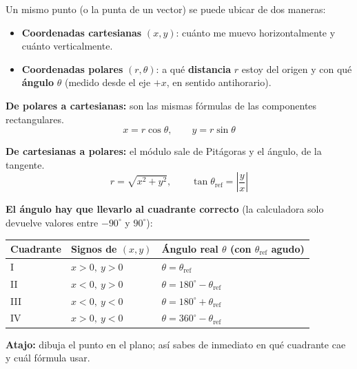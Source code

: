 \documentclass[12pt, letterpaper]{article}
\providecommand{\sen}{\sin}
\begin{document}
\begin{cuadroteoria}
  Un mismo punto (o la punta de un vector) se puede ubicar de dos maneras:
  \begin{itemize}[leftmargin=*]
    \item \textbf{Coordenadas cartesianas} $(x, y)$: cuánto me muevo horizontalmente y cuánto verticalmente.
    \item \textbf{Coordenadas polares} $(r, \theta)$: a qué \textbf{distancia} $r$ estoy del origen y con qué \textbf{ángulo} $\theta$ (medido desde el eje $+x$, en sentido antihorario).
  \end{itemize}
  \begin{center}
  \end{center}

  \textbf{De polares a cartesianas:} son las mismas fórmulas de las componentes rectangulares.
  $$x = r\cos\theta, \qquad y = r\sen\theta$$

  \textbf{De cartesianas a polares:} el módulo sale de Pitágoras y el ángulo, de la tangente.
  $$r = \sqrt{x^2 + y^2}, \qquad \tan\theta_{\text{ref}} = \left|\frac{y}{x}\right|$$
\end{cuadroteoria}

\begin{cuadroteoria}
  \textbf{El ángulo hay que llevarlo al cuadrante correcto} (la calculadora solo devuelve valores entre $-90^{\circ}$ y $90^{\circ}$):
  \begin{center}
    \begin{tabular}{lll}
      \toprule
      Cuadrante & Signos de $(x, y)$ & Ángulo real $\theta$ (con $\theta_{\text{ref}}$ agudo) \\
      \midrule
      I   & $x > 0,\ y > 0$ & $\theta = \theta_{\text{ref}}$              \\
      II  & $x < 0,\ y > 0$ & $\theta = 180^{\circ} - \theta_{\text{ref}}$ \\
      III & $x < 0,\ y < 0$ & $\theta = 180^{\circ} + \theta_{\text{ref}}$ \\
      IV  & $x > 0,\ y < 0$ & $\theta = 360^{\circ} - \theta_{\text{ref}}$ \\
      \bottomrule
    \end{tabular}
  \end{center}
  \textbf{Atajo:} dibuja el punto en el plano; así sabes de inmediato en qué cuadrante cae y cuál fórmula usar.
\end{cuadroteoria}
\end{document}
